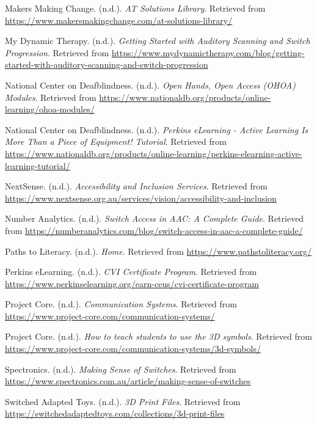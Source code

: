 \begin{thebibliography}{99}
 Makers Making Change. (n.d.). \textit{AT Solutions Library}. Retrieved from \url{https://www.makersmakingchange.com/at-solutions-library/}

 My Dynamic Therapy. (n.d.). \textit{Getting Started with Auditory Scanning and Switch Progression}. Retrieved from \url{https://www.mydynamictherapy.com/blog/getting-started-with-auditory-scanning-and-switch-progression}

 National Center on Deafblindness. (n.d.). \textit{Open Hands, Open Access (OHOA) Modules}. Retrieved from \url{https://www.nationaldb.org/products/online-learning/ohoa-modules/}

 National Center on Deafblindness. (n.d.). \textit{Perkins eLearning - Active Learning Is More Than a Piece of Equipment! Tutorial}. Retrieved from \url{https://www.nationaldb.org/products/online-learning/perkins-elearning-active-learning-tutorial/}

 NextSense. (n.d.). \textit{Accessibility and Inclusion Services}. Retrieved from \url{https://www.nextsense.org.au/services/vision/accessibility-and-inclusion}

 Number Analytics. (n.d.). \textit{Switch Access in AAC: A Complete Guide}. Retrieved from \url{https://numberanalytics.com/blog/switch-access-in-aac-a-complete-guide/}

 Paths to Literacy. (n.d.). \textit{Home}. Retrieved from \url{https://www.pathstoliteracy.org/}

 Perkins eLearning. (n.d.). \textit{CVI Certificate Program}. Retrieved from \url{https://www.perkinselearning.org/earn-ceus/cvi-certificate-program}

 Project Core. (n.d.). \textit{Communication Systems}. Retrieved from \url{https://www.project-core.com/communication-systems/}

 Project Core. (n.d.). \textit{How to teach students to use the 3D symbols}. Retrieved from \url{https://www.project-core.com/communication-systems/3d-symbols/}

 Spectronics. (n.d.). \textit{Making Sense of Switches}. Retrieved from \url{https://www.spectronics.com.au/article/making-sense-of-switches}

 Switched Adapted Toys. (n.d.). \textit{3D Print Files}. Retrieved from \url{https://switchedadaptedtoys.com/collections/3d-print-files}


\end{thebibliography}
